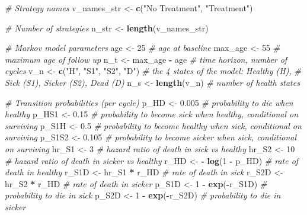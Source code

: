 \documentclass[
]{article}
\newenvironment{Shaded}{\begin{snugshade}}{\end{snugshade}}
\newcommand{\CommentTok}[1]{\textcolor[rgb]{0.56,0.35,0.01}{\textit{#1}}}
\newcommand{\DecValTok}[1]{\textcolor[rgb]{0.00,0.00,0.81}{#1}}
\newcommand{\FloatTok}[1]{\textcolor[rgb]{0.00,0.00,0.81}{#1}}
\newcommand{\KeywordTok}[1]{\textcolor[rgb]{0.13,0.29,0.53}{\textbf{#1}}}
\newcommand{\NormalTok}[1]{#1}
\newcommand{\OperatorTok}[1]{\textcolor[rgb]{0.81,0.36,0.00}{\textbf{#1}}}
\newcommand{\StringTok}[1]{\textcolor[rgb]{0.31,0.60,0.02}{#1}}
\begin{document}
\begin{Shaded}
\begin{Highlighting}[]
\CommentTok{# Strategy names}
\NormalTok{v_names_str <-}\StringTok{ }\KeywordTok{c}\NormalTok{(}\StringTok{"No Treatment"}\NormalTok{, }\StringTok{"Treatment"}\NormalTok{) }

\CommentTok{# Number of strategies}
\NormalTok{n_str <-}\StringTok{ }\KeywordTok{length}\NormalTok{(v_names_str)}

\CommentTok{# Markov model parameters}
\NormalTok{age     <-}\StringTok{ }\DecValTok{25}                       \CommentTok{# age at baseline}
\NormalTok{max_age <-}\StringTok{ }\DecValTok{55}                       \CommentTok{# maximum age of follow up}
\NormalTok{n_t     <-}\StringTok{ }\NormalTok{max_age }\OperatorTok{-}\StringTok{ }\NormalTok{age            }\CommentTok{# time horizon, number of cycles}
\NormalTok{v_n     <-}\StringTok{ }\KeywordTok{c}\NormalTok{(}\StringTok{"H"}\NormalTok{, }\StringTok{"S1"}\NormalTok{, }\StringTok{"S2"}\NormalTok{, }\StringTok{"D"}\NormalTok{)  }\CommentTok{# the 4 states of the model: Healthy (H), }
                                    \CommentTok{# Sick (S1), Sicker (S2), Dead (D)}
\NormalTok{n_s     <-}\StringTok{ }\KeywordTok{length}\NormalTok{(v_n)              }\CommentTok{# number of health states }

\CommentTok{# Transition probabilities (per cycle)}
\NormalTok{p_HD    <-}\StringTok{ }\FloatTok{0.005}                    \CommentTok{# probability to die when healthy}
\NormalTok{p_HS1   <-}\StringTok{ }\FloatTok{0.15}                       \CommentTok{# probability to become sick when healthy, conditional on surviving}
\NormalTok{p_S1H   <-}\StringTok{ }\FloatTok{0.5}                        \CommentTok{# probability to become healthy when sick, conditional on surviving}
\NormalTok{p_S1S2  <-}\StringTok{ }\FloatTok{0.105}                      \CommentTok{# probability to become sicker when sick, conditional on surviving }
\NormalTok{hr_S1   <-}\StringTok{ }\DecValTok{3}                          \CommentTok{# hazard ratio of death in sick vs healthy}
\NormalTok{hr_S2   <-}\StringTok{ }\DecValTok{10}                         \CommentTok{# hazard ratio of death in sicker vs healthy }
\NormalTok{r_HD    <-}\StringTok{ }\OperatorTok{-}\StringTok{ }\KeywordTok{log}\NormalTok{(}\DecValTok{1} \OperatorTok{-}\StringTok{ }\NormalTok{p_HD)          }\CommentTok{# rate of death in healthy}
\NormalTok{r_S1D   <-}\StringTok{ }\NormalTok{hr_S1 }\OperatorTok{*}\StringTok{ }\NormalTok{r_HD               }\CommentTok{# rate of death in sick}
\NormalTok{r_S2D   <-}\StringTok{ }\NormalTok{hr_S2 }\OperatorTok{*}\StringTok{ }\NormalTok{r_HD               }\CommentTok{# rate of death in sicker}
\NormalTok{p_S1D   <-}\StringTok{ }\DecValTok{1} \OperatorTok{-}\StringTok{ }\KeywordTok{exp}\NormalTok{(}\OperatorTok{-}\NormalTok{r_S1D)          }\CommentTok{# probability to die in sick}
\NormalTok{p_S2D   <-}\StringTok{ }\DecValTok{1} \OperatorTok{-}\StringTok{ }\KeywordTok{exp}\NormalTok{(}\OperatorTok{-}\NormalTok{r_S2D)          }\CommentTok{# probability to die in sicker}


\end{Highlighting}
\end{Shaded}
\end{document}

